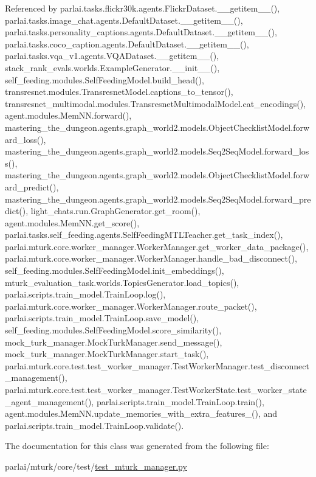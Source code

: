 Referenced by parlai.\+tasks.\+flickr30k.\+agents.\+Flickr\+Dataset.\+\_\+\+\_\+getitem\+\_\+\+\_\+(), parlai.\+tasks.\+image\+\_\+chat.\+agents.\+Default\+Dataset.\+\_\+\+\_\+getitem\+\_\+\+\_\+(), parlai.\+tasks.\+personality\+\_\+captions.\+agents.\+Default\+Dataset.\+\_\+\+\_\+getitem\+\_\+\+\_\+(), parlai.\+tasks.\+coco\+\_\+caption.\+agents.\+Default\+Dataset.\+\_\+\+\_\+getitem\+\_\+\+\_\+(), parlai.\+tasks.\+vqa\+\_\+v1.\+agents.\+V\+Q\+A\+Dataset.\+\_\+\+\_\+getitem\+\_\+\+\_\+(), stack\+\_\+rank\+\_\+evals.\+worlds.\+Example\+Generator.\+\_\+\+\_\+init\+\_\+\+\_\+(), self\+\_\+feeding.\+modules.\+Self\+Feeding\+Model.\+build\+\_\+head(), transresnet.\+modules.\+Transresnet\+Model.\+captions\+\_\+to\+\_\+tensor(), transresnet\+\_\+multimodal.\+modules.\+Transresnet\+Multimodal\+Model.\+cat\+\_\+encodings(), agent.\+modules.\+Mem\+N\+N.\+forward(), mastering\+\_\+the\+\_\+dungeon.\+agents.\+graph\+\_\+world2.\+models.\+Object\+Checklist\+Model.\+forward\+\_\+loss(), mastering\+\_\+the\+\_\+dungeon.\+agents.\+graph\+\_\+world2.\+models.\+Seq2\+Seq\+Model.\+forward\+\_\+loss(), mastering\+\_\+the\+\_\+dungeon.\+agents.\+graph\+\_\+world2.\+models.\+Object\+Checklist\+Model.\+forward\+\_\+predict(), mastering\+\_\+the\+\_\+dungeon.\+agents.\+graph\+\_\+world2.\+models.\+Seq2\+Seq\+Model.\+forward\+\_\+predict(), light\+\_\+chats.\+run.\+Graph\+Generator.\+get\+\_\+room(), agent.\+modules.\+Mem\+N\+N.\+get\+\_\+score(), parlai.\+tasks.\+self\+\_\+feeding.\+agents.\+Self\+Feeding\+M\+T\+L\+Teacher.\+get\+\_\+task\+\_\+index(), parlai.\+mturk.\+core.\+worker\+\_\+manager.\+Worker\+Manager.\+get\+\_\+worker\+\_\+data\+\_\+package(), parlai.\+mturk.\+core.\+worker\+\_\+manager.\+Worker\+Manager.\+handle\+\_\+bad\+\_\+disconnect(), self\+\_\+feeding.\+modules.\+Self\+Feeding\+Model.\+init\+\_\+embeddings(), mturk\+\_\+evaluation\+\_\+task.\+worlds.\+Topics\+Generator.\+load\+\_\+topics(), parlai.\+scripts.\+train\+\_\+model.\+Train\+Loop.\+log(), parlai.\+mturk.\+core.\+worker\+\_\+manager.\+Worker\+Manager.\+route\+\_\+packet(), parlai.\+scripts.\+train\+\_\+model.\+Train\+Loop.\+save\+\_\+model(), self\+\_\+feeding.\+modules.\+Self\+Feeding\+Model.\+score\+\_\+similarity(), mock\+\_\+turk\+\_\+manager.\+Mock\+Turk\+Manager.\+send\+\_\+message(), mock\+\_\+turk\+\_\+manager.\+Mock\+Turk\+Manager.\+start\+\_\+task(), parlai.\+mturk.\+core.\+test.\+test\+\_\+worker\+\_\+manager.\+Test\+Worker\+Manager.\+test\+\_\+disconnect\+\_\+management(), parlai.\+mturk.\+core.\+test.\+test\+\_\+worker\+\_\+manager.\+Test\+Worker\+State.\+test\+\_\+worker\+\_\+state\+\_\+agent\+\_\+management(), parlai.\+scripts.\+train\+\_\+model.\+Train\+Loop.\+train(), agent.\+modules.\+Mem\+N\+N.\+update\+\_\+memories\+\_\+with\+\_\+extra\+\_\+features\+\_\+(), and parlai.\+scripts.\+train\+\_\+model.\+Train\+Loop.\+validate().



The documentation for this class was generated from the following file\+:\begin{DoxyCompactItemize}
\item 
parlai/mturk/core/test/\hyperlink{test_2test__mturk__manager_8py}{test\+\_\+mturk\+\_\+manager.\+py}\end{DoxyCompactItemize}
